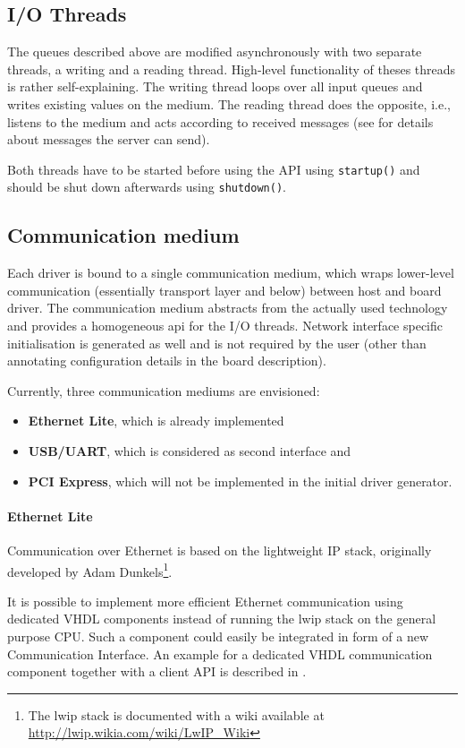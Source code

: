 \documentclass{report}
\begin{document}
\subsection{I/O Threads}
The queues described above are modified asynchronously with two separate threads, a writing and a reading thread. High-level functionality of theses threads is rather self-explaining. The writing thread loops over all input queues and writes existing values on the medium. The reading thread does the opposite, i.e., listens to the medium and acts according to received messages (see  for details about messages the server can send).

Both threads have to be started before using the API using \texttt{startup()} and should be shut down afterwards using \texttt{shutdown()}.

\subsection{Communication medium}
Each driver is bound to a single communication medium, which wraps lower-level communication (essentially transport layer and below) between host and board driver. The communication medium abstracts from the actually used technology and provides a homogeneous api for the I/O threads. Network interface specific initialisation is generated as well and is not required by the user (other than annotating configuration details in the board description).

Currently, three communication mediums are envisioned:
\begin{itemize} \itemsep1pt \parskip0pt 
\item \textbf{Ethernet Lite}, which is already implemented
\item \textbf{USB/UART}, which is considered as second interface and
\item \textbf{PCI Express}, which will not be implemented in the initial driver generator.
\end{itemize}

\paragraph{Ethernet Lite}
Communication over Ethernet is based on the lightweight IP stack, originally developed by Adam Dunkels\footnote{The lwip stack is documented with a wiki available at \url{http://lwip.wikia.com/wiki/LwIP_Wiki}}.

It is possible to implement more efficient Ethernet communication using dedicated VHDL components instead of running the lwip stack on the general purpose CPU. Such a component could easily be integrated in form of a new Communication Interface. An example for a dedicated VHDL communication component together with a client API is described in \cite{alachiotis10, alachiotis12}.
\end{document}
